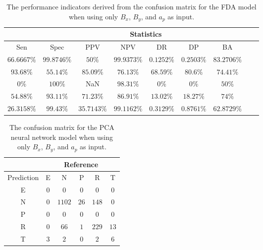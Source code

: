 \begin{table}[!ht]
	\centering
	\begin{tabular}{|c|c|c|c|c|c|c|c|c|}
		\hline
		 & \multicolumn{7}{c|}{Statistics} \\ \hline
		Sen & Spec & PPV & NPV & DR & DP & BA \\ \hline
		$66.6667\%$ & $99.8746\%$ & $50\%$ & $99.9373\%$ & $0.1252\%$ & $0.2503\%$ & $83.2706\%$ \\ \hline
		$93.68\%$ & $55.14\%$ & $85.09\%$ & $76.13\%$ & $68.59\%$ & $80.6\%$ & $74.41\%$ \\ \hline
		$0\%$ & $100\%$ & NaN & $98.31\%$ & $0\%$ & $0\%$ & $50\%$ \\ \hline
		$54.88\%$ & $93.11\%$ & $71.23\%$ & $86.91\%$ & $13.02\%$ & $18.27\%$ & $74\%$ \\ \hline
		$26.3158\%$ & $99.43\%$ & $35.7143\%$ & $99.1162\%$ & $0.3129\%$ & $0.8761\%$ & $62.8729\%$ \\ \hline
	\end{tabular}
	\caption{The performance indicators derived from the confusion matrix for the FDA model when using only $B_{x}$, $B_{y}$, and $a_{p}$ as input.}
	\label{tab:cs:xyap:fda}
\end{table}

\begin{table}[!ht]
	\centering
	\begin{tabular}{|c|c|c|c|c|c|}
		\hline
		 & \multicolumn{5}{|c|}{Reference} \\ \hline
		 Prediction & E & N & P & R & T \\ \hline
		 E & $0$ & $0$ & $0$ & $0$ & $0$ \\ \hline
		 N & $0$ & $1102$ & $26$ & $148$ & $0$ \\ \hline
		 P & $0$ & $0$ & $0$ & $0$ & $0$ \\ \hline
		 R & $0$ & $66$ & $1$ & $229$ & $13$ \\ \hline
		 T & $3$ & $2$ & $0$ & $2$ & $6$ \\ \hline
	\end{tabular}
	\caption{The confusion matrix for the PCA neural network model when using only $B_{x}$, $B_{y}$, and $a_{p}$ as input.}
	\label{tab:cm:xyap:pcaNNet}
\end{table}

